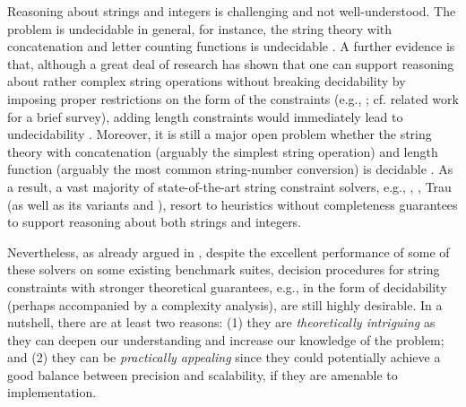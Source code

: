 Reasoning about strings and integers is challenging and not well-understood. 
The problem is undecidable in general,  for instance, the string theory with concatenation and letter counting functions is undecidable \cite{buchi}. 
A further evidence is that, although a great deal of research has shown that one can support reasoning about rather complex string operations without breaking decidability by imposing proper restrictions on the form of the constraints (e.g., \cite{CCH+18,CHL+19}; cf. related work for a brief survey), adding length constraints would immediately lead to undecidability \cite{CCH+18}. Moreover, it is still a major open problem whether the string theory with concatenation (arguably the simplest string operation) and length function (arguably the most common string-number conversion) is decidable \cite{Vijay-length}. 
%
As a result, a vast majority of  state-of-the-art string constraint solvers, e.g., {\cvc} \cite{cvc4}, {\zthree} \cite{Z3-str3}, Trau \cite{Abdulla17} (as well as its variants {\trauplus} \cite{AbdullaA+19} and {\zthreetrau} \cite{Z3-trau}),  
resort to heuristics without completeness guarantees to support reasoning about both strings and integers.

Nevertheless, as already argued in \cite{CHL+19}, despite the excellent performance of some of these solvers on some existing benchmark suites, decision procedures for string constraints with stronger theoretical guarantees, e.g., in the form of decidability (perhaps accompanied by a complexity analysis), are still highly desirable. In a nutshell, there are at least two reasons: (1) they are \emph{theoretically intriguing} as they can deepen our understanding and increase our knowledge of the problem; and  %
(2) they can be \emph{practically appealing} since they could potentially achieve a good balance between precision and scalability, if they are amenable to implementation. 

